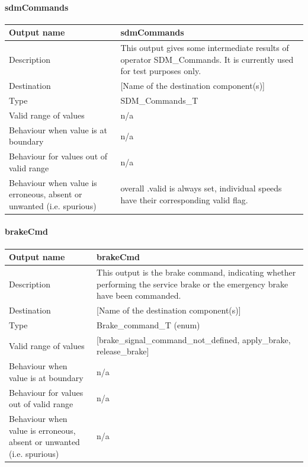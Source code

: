 \paragraph{sdmCommands}

\begin{longtable}{p{}p{}}
\toprule
Output name				& sdmCommands \\
\midrule
Description				& This output gives some intermediate results of operator SDM\_Commands. It is currently used for test purposes only. \\
\midrule
Destination				& [Name of the destination component(s)] \\ 
\midrule
Type					& SDM\_Commands\_T \\
\midrule
Valid range of values	& n/a \\
\midrule
Behaviour when value is at boundary	& n/a \\
\midrule
Behaviour for values out of valid range	& n/a \\
\midrule
Behaviour when value is erroneous, absent or unwanted (i.e. spurious) & overall .valid is always set, individual speeds have their corresponding valid flag. \\
\bottomrule
\end{longtable}

\paragraph{brakeCmd}

\begin{longtable}{p{}p{}}
\toprule
Output name				& brakeCmd \\
\midrule
Description				& This output is the brake command, indicating whether performing the service brake or the emergency brake have been commanded. \\
\midrule
Destination				& [Name of the destination component(s)] \\ 
\midrule
Type					& Brake\_command\_T (enum)\\
\midrule
Valid range of values	& [brake_signal_command_not_defined, apply_brake, release_brake] \\
\midrule
Behaviour when value is at boundary	& n/a \\
\midrule
Behaviour for values out of valid range	& n/a \\
\midrule
Behaviour when value is erroneous, absent or unwanted (i.e. spurious) & n/a \\
\bottomrule
\end{longtable}


